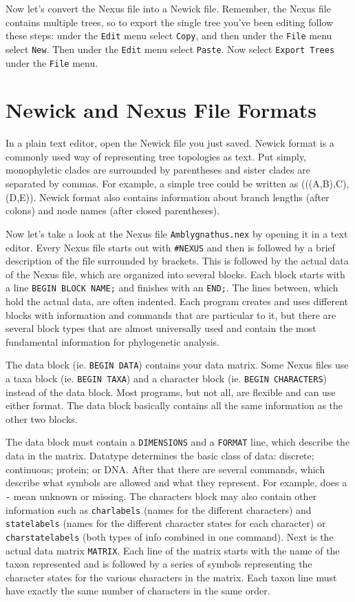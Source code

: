 \documentclass[11pt]{article}
\begin{document}
Now let's convert the Nexus file into a Newick file.
Remember, the Nexus file contains multiple trees, so to 
export the single tree you've been editing follow these steps: 
under the \texttt{Edit} menu select \texttt{Copy}, and then under the \texttt{File}
menu select \texttt{New}. Then under the \texttt{Edit} menu select \texttt{Paste}.
Now select \texttt{Export Trees} under the \texttt{File} menu.

\section{Newick and Nexus File Formats}

In a plain text editor, open the Newick file you just saved.
Newick format is a commonly used way of representing tree topologies as text. 
Put simply, monophyletic clades are surrounded by parentheses and sister clades are separated by commas. 
For example, a simple tree could be written as (((A,B),C),(D,E)). 
Newick format also contains information about branch lengths (after colons) and node names (after closed parentheses).


Now let’s take a look at the Nexus file \texttt{Amblygnathus.nex} by opening it in a text editor. 
Every Nexus file starts out with \texttt{\#NEXUS} and then is followed by a brief description of the file surrounded by brackets. 
This is followed by the actual data of the Nexus file, which are organized into several blocks. 
Each block starts with a line \texttt{BEGIN BLOCK NAME;} and finishes with an \texttt{END;}. 
The lines between, which hold the actual data, are often indented. 
Each program creates and uses different blocks with information and commands that are particular to it, 
but there are several block types that are almost universally used and contain the most fundamental information for phylogenetic analysis.


The data block (ie. \texttt{BEGIN DATA}) contains your data matrix.
Some Nexus files use a taxa block (ie. \texttt{BEGIN TAXA}) and a character block (ie. \texttt{BEGIN CHARACTERS}) instead of the data block. 
Most programs, but not all, are flexible and can use either format. 
The data block basically contains all the same information as the other two blocks.

The data block must contain a \texttt{DIMENSIONS} and a \texttt{FORMAT} line, which describe the data in the matrix. 
Datatype determines the basic class of data: discrete; continuous; protein; or DNA. 
After that there are several commands, which describe what symbols are allowed and what they represent. 
For example, does a \texttt{-} mean unknown or missing. 
The characters block may also contain other information such as \texttt{charlabels} (names for the different characters) 
and \texttt{statelabels} (names for the different character states for each character) or \texttt{charstatelabels} (both types of info combined in one command).
Next is the actual data matrix \texttt{MATRIX}. 
Each line of the matrix starts with the name of the taxon represented and is followed by
a series of symbols representing the character states for the various characters in the matrix. 
Each taxon line must have exactly the same number of characters in the same order. 
\end{document}
